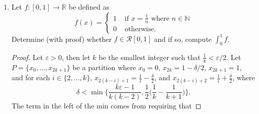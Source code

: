 \documentclass[12pt]{article}
\begin{document}
\begin{enumerate}
\begin{proof}
               \begin{equation}
                   \frac{f(n)-f(m)}{n-m}\leq
                   \frac{|f(n)-f(m)|}{|n-m|}<\varepsilon.
               \end{equation}
               Then since $f$ is differentiable over $(m, n)$ and continuous
               over $[m, n]$ then by the MVT, there exists
               $z=z(N(\varepsilon))\in(m, n)$ such that 
               \begin{equation}
                   f'(z)=\frac{f(n)-f(m)}{n-m}<\varepsilon.
               \end{equation}
               Now define the following sequence $\{z_k\}_k$ where for each
               $k\in\mathbb{N}$, we define $\varepsilon=1/k$, and from which we
               obtain $N(\varepsilon)$, and from that we obtain
               $m=N(\varepsilon)+1$ and $n=m+1$, and finally $z_k\in(m, n)$
               which satisfies (7). From this we see that $\{f'(z_k)\}$ is
               a sequence which converges to zero. 
            \end{proof}
        \item Let $f:[0, 1]\to\mathbb{R}$ be defined as 
            \begin{equation}
                f(x)=\begin{cases}
                    1&\text{ if $x=\frac{1}{n}$ where $n\in\mathbb{N}$} \\
                    0&\text{ otherwise. }
                \end{cases}
            \end{equation}
            Determine (with proof) whether $f\in\mathcal{R}[0, 1]$ and if so,
            compute $\int_{0}^{1}f$.
            \begin{proof}
                Let $\varepsilon>0$, then let $k$ be the smallest integer such
                that $\frac{1}{k}<\varepsilon/2$. Let $P=\{x_0, \dots,
                x_{2k+1}\}$ be a partition where $x_0=0$, $x_{2k}=1-\delta/2$,
                $x_{2k+1}=1$, and for each $i\in\{2, \dots, k\}$,
                $x_{2(k-i)+1}=\frac{1}{i}-\frac{\delta}{2}$, and
                $x_{2(k-i)+2}=\frac{1}{i}+\frac{\delta}{2}$, where
                \begin{equation*}
                    \delta<\min\{\frac{k\varepsilon-1}{k(k-2)},
                    \frac{1}{2}\big(\frac{1}{k}-\frac{1}{k+1}\big)\}.
                \end{equation*}
                The term in the left of the min comes from requiring that

\end{proof}
\end{enumerate}
\end{document}
